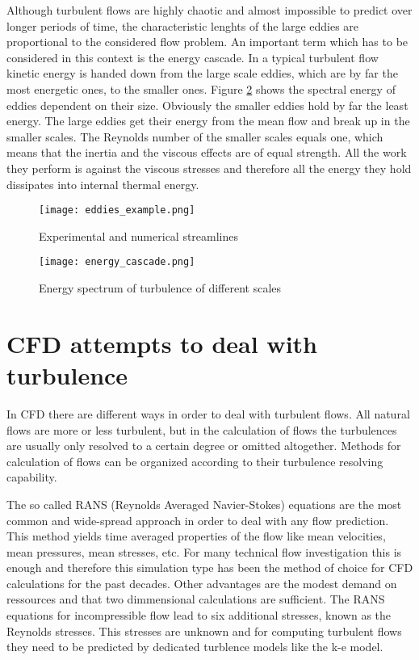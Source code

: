 Although turbulent flows are highly chaotic and almost impossible to predict over longer periods of time, the characteristic lenghts of the large eddies are proportional to the considered flow problem. An important term which has to be considered in this context is the energy cascade. In a typical turbulent flow kinetic energy is handed down from the large scale eddies, which are by far the most energetic ones, to the smaller ones. Figure \ref{fig:cascade} shows the spectral energy of eddies dependent on their size. Obviously the smaller eddies hold by far the least energy. The large eddies get their energy from the mean flow and break up in the smaller scales. The Reynolds number of the smaller scales equals one, which means that the inertia and the viscous effects are of equal strength. All the work they perform is against the viscous stresses and therefore all the energy they hold dissipates into internal thermal energy.

\begin{figure}[ht]
\centering
\texttt{[image: eddies\_example.png]}
\caption{Experimental and numerical streamlines}
\label{fig:example}
\end{figure}

\begin{figure}[ht]
\centering
\texttt{[image: energy\_cascade.png]}
\caption{Energy spectrum of turbulence of different scales}
\label{fig:cascade}
\end{figure}

\section{CFD attempts to deal with turbulence}
In CFD there are different ways in order to deal with turbulent flows. All natural flows are more or less turbulent, but in the calculation of flows the turbulences are usually only resolved to a certain degree or omitted altogether. Methods for calculation of flows can be organized according to their turbulence resolving capability.

The so called RANS (Reynolds Averaged Navier-Stokes) equations are the most common and wide-spread approach in order to deal with any flow prediction.
This method yields time averaged properties of the flow like mean velocities, mean pressures, mean stresses, etc. For many technical flow investigation this is enough and therefore this simulation type has been the method of choice for CFD calculations for the past decades. Other advantages are the modest demand on ressources and that two dimmensional calculations are sufficient.
The RANS equations for incompressible flow lead to six additional stresses, known as the Reynolds stresses. This stresses are unknown and for computing turbulent flows they need to be predicted by dedicated turblence models like the k-e model.

